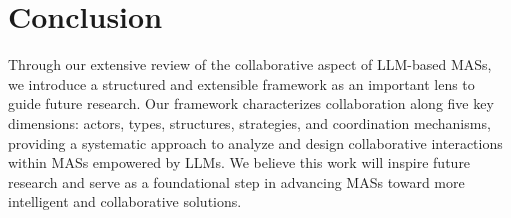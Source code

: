 \documentclass[acmsmall,nonacm]{acmart}
\begin{document}
\section{Conclusion} \label{sec:Conclusion}
    Through our extensive review of the collaborative aspect of LLM-based MASs, we introduce a structured and extensible framework as an important lens to guide future research. Our framework characterizes collaboration along five key dimensions: actors, types, structures, strategies, and coordination mechanisms, providing a systematic approach to analyze and design collaborative interactions within MASs empowered by LLMs. We believe this work will inspire future research and serve as a foundational step in advancing MASs toward more intelligent and collaborative solutions.





\end{document}

